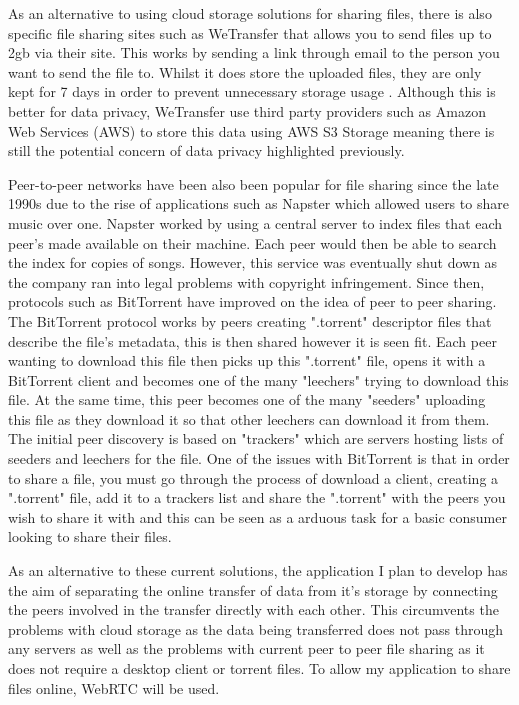 \documentclass[]{report}
\begin{document}
			As an alternative to using cloud storage solutions for sharing files, there is also specific file sharing sites such as WeTransfer that allows you to send files up to 2gb via their site. This works by sending a link through email to the person you want to send the file to. Whilst it does store the uploaded files, they are only kept for 7 days in order to prevent unnecessary storage usage \cite{WeTransfer Storage Time}. Although this is better for data privacy, WeTransfer use third party providers such as Amazon Web Services (AWS) to store this data using AWS S3 Storage \cite{WeTransfer AWS Case Study} meaning there is still the potential concern of data privacy highlighted previously.
			
			Peer-to-peer networks have been also been popular for file sharing since the late 1990s due to the rise of applications such as Napster which allowed users to share music over one. Napster worked by using a central server to index files that each peer's made available on their machine. Each peer would then be able to search the index for copies of songs. However, this service was eventually shut down as the company ran into legal problems with copyright infringement. Since then, protocols such as BitTorrent have improved on the idea of peer to peer sharing. The BitTorrent protocol works by peers creating ".torrent" descriptor files that describe the file's metadata, this is then shared however it is seen fit. Each peer wanting to download this file then picks up this ".torrent" file, opens it with a BitTorrent client and becomes one of the many "leechers" trying to download this file. At the same time, this peer becomes one of the many "seeders" uploading this file as they download it so that other leechers can download it from them. The initial peer discovery is based on "trackers" which are servers hosting lists of seeders and leechers for the file. One of the issues with BitTorrent is that in order to share a file, you must go through the process of download a client, creating a ".torrent" file, add it to a trackers list and share the ".torrent" with the peers you wish to share it with and this can be seen as a arduous task for a basic consumer looking to share their files. 

			As an alternative to these current solutions, the application I plan to develop has the aim of separating the online transfer of data from it's storage by connecting the peers involved in the transfer directly with each other. This circumvents the problems with cloud storage as the data being transferred does not pass through any servers as well as the problems with current peer to peer file sharing as it does not require a desktop client or torrent files. To allow my application to share files online, WebRTC will be used.
			
\end{document}
